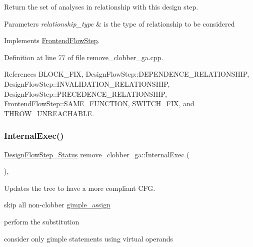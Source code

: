 Return the set of analyses in relationship with this design step. 


\begin{DoxyParams}{Parameters}
{\em relationship\+\_\+type} & is the type of relationship to be considered \\
\hline
\end{DoxyParams}


Implements \hyperlink{classFrontendFlowStep_abeaff70b59734e462d347ed343dd700d}{Frontend\+Flow\+Step}.



Definition at line 77 of file remove\+\_\+clobber\+\_\+ga.\+cpp.



References B\+L\+O\+C\+K\+\_\+\+F\+IX, Design\+Flow\+Step\+::\+D\+E\+P\+E\+N\+D\+E\+N\+C\+E\+\_\+\+R\+E\+L\+A\+T\+I\+O\+N\+S\+H\+IP, Design\+Flow\+Step\+::\+I\+N\+V\+A\+L\+I\+D\+A\+T\+I\+O\+N\+\_\+\+R\+E\+L\+A\+T\+I\+O\+N\+S\+H\+IP, Design\+Flow\+Step\+::\+P\+R\+E\+C\+E\+D\+E\+N\+C\+E\+\_\+\+R\+E\+L\+A\+T\+I\+O\+N\+S\+H\+IP, Frontend\+Flow\+Step\+::\+S\+A\+M\+E\+\_\+\+F\+U\+N\+C\+T\+I\+ON, S\+W\+I\+T\+C\+H\+\_\+\+F\+IX, and T\+H\+R\+O\+W\+\_\+\+U\+N\+R\+E\+A\+C\+H\+A\+B\+LE.

\mbox{\label{classremove__clobber__ga_abea85b05a86d42b44170ab4919ac2476}} 
\subsubsection{\texorpdfstring{Internal\+Exec()}{InternalExec()}}
{\footnotesize\ttfamily \hyperlink{design__flow__step_8hpp_afb1f0d73069c26076b8d31dbc8ebecdf}{Design\+Flow\+Step\+\_\+\+Status} remove\+\_\+clobber\+\_\+ga\+::\+Internal\+Exec (\begin{DoxyParamCaption}{ }\end{DoxyParamCaption})\hspace{0.3cm}{\ttfamily [override]}, {\ttfamily [virtual]}}



Updates the tree to have a more compliant C\+FG. 

skip all non-\/clobber \hyperlink{structgimple__assign}{gimple\+\_\+assign}

perform the substitution

consider only gimple statements using virtual operands

